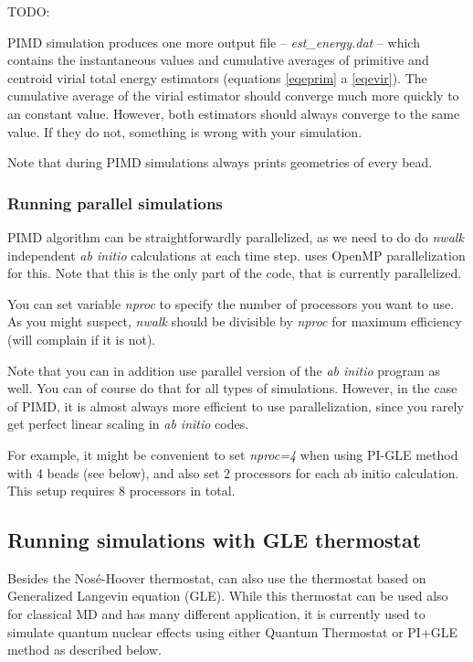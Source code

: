 \documentclass[12pt,a4paper]{article}
\begin{document}
TODO:

PIMD simulation produces one more output file -- \textit{est\_energy.dat} -- which contains the instantaneous values and cumulative averages of primitive and centroid virial total energy estimators (equations \ref{eqeprim} a \ref{eqevir}). The cumulative average of the virial estimator should converge much more quickly to an constant value. However, both estimators should always converge to the same value. If they do not, something is wrong with your simulation.

Note that during PIMD simulations \abin always prints geometries of every bead.

\subsubsection{Running parallel simulations}

PIMD algorithm can be straightforwardly parallelized, as we need to do do \textit{nwalk} independent \textit{ab initio} calculations at each time step.
\abin uses OpenMP parallelization for this. Note that this is the only part of the code, that is currently parallelized.

You can set variable \textit{nproc} to specify the number of processors you want to use. As you might suspect, \textit{nwalk} should be divisible by \textit{nproc} for maximum efficiency (\abin will complain if it is not).

Note that you can in addition use parallel version of the \textit{ab initio} program as well. You can of course do that for all types of simulations. However, in the case of PIMD, it is almost always more efficient to use \abin parallelization, since you rarely get perfect linear scaling in \textit{ab initio} codes.

For example, it might be convenient to set \textit{nproc=4} when using PI-GLE method with 4 beads (see below), and also set 2 processors for each ab initio calculation. This setup requires 8 processors in total.

\subsection{Running simulations with GLE thermostat}
Besides the Nosé-Hoover thermostat, \abin can also use the thermostat based on Generalized Langevin equation (GLE). While this thermostat can be used also for classical MD and has many different application, it is currently used to simulate quantum nuclear effects using either Quantum Thermostat or PI+GLE method as described below.
\end{document}
